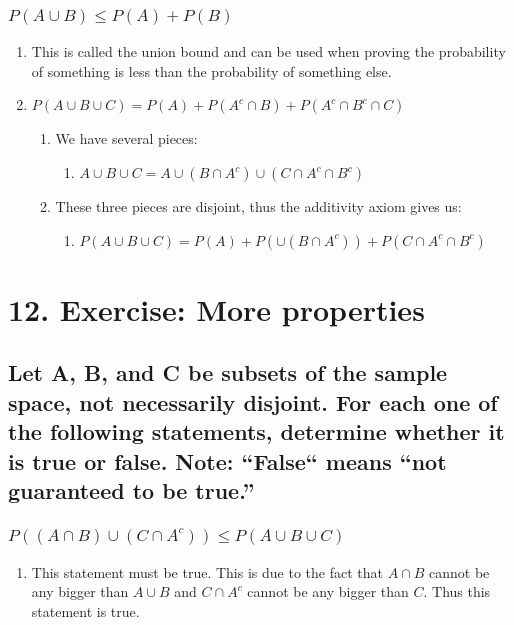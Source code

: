 \documentclass[11pt]{article}
\begin{document}
\subsubsection{\(P(A \cup B) \le P(A) + P(B)\)}
\label{sec:org50a6c8e}
\begin{enumerate}
\item This is called the union bound and can be used when proving the probability of something is less than the probability of something else.
\label{sec:org06214ad}
\item \(P(A \cup B \cup C) = P(A) +P(A^c \cap B) + P(A^c \cap B^c \cap C)\)
\label{sec:org53f10d9}
\begin{enumerate}
\item We have several pieces:
\label{sec:org75f254c}
\begin{enumerate}
\item \(A \cup B \cup C=A \cup (B \cap A^c) \cup (C \cap A^c \cap B^c)\)
\label{sec:orgc306eec}
\end{enumerate}
\item These three pieces are disjoint, thus the additivity axiom gives us:
\label{sec:orge1b4b1b}
\begin{enumerate}
\item \(P(A \cup B \cup C)=P(A)+ P(\cup (B \cap A^c)) + P(C \cap A^c \cap B^c)\)
\label{sec:org404f299}
\end{enumerate}
\end{enumerate}
\end{enumerate}
\section{12. Exercise: More properties}
\label{sec:org7657ce4}
\subsection{Let A, B, and C be subsets of the sample space, not necessarily disjoint. For each one of the following statements, determine whether it is true or false. Note: “False`` means “not guaranteed to be true.''}
\label{sec:orgef69561}
\subsubsection{\(P( (A \cap B) \cup (C \cap A^c) ) \le P(A \cup B \cup C)\)}
\label{sec:org849098d}
\begin{enumerate}
\item This statement must be true. This is due to the fact that \(A \cap B\) cannot be any bigger than \(A \cup B\) and \(C \cap A^c\) cannot be any bigger than \(C\). Thus this statement is true.
\label{sec:org29d9c56}
\end{enumerate}
\end{document}
